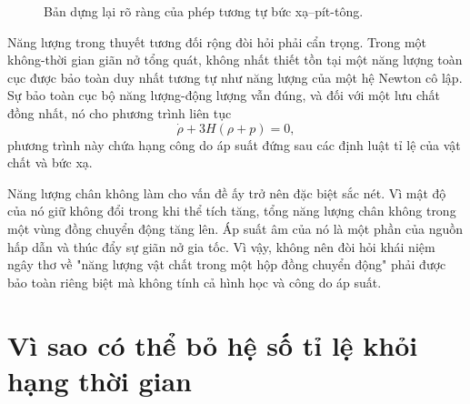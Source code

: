 \begin{figure}[H]
  \centering
  \caption{Bản dựng lại rõ ràng của phép tương tự bức xạ–pít-tông.}
  \label{fig:l09-piston-clean}
\end{figure}

Năng lượng trong thuyết tương đối rộng đòi hỏi phải cẩn trọng. Trong một không-thời gian giãn nở tổng quát, không nhất thiết tồn tại một năng lượng toàn cục được bảo toàn duy nhất tương tự như năng lượng của một hệ Newton cô lập. Sự bảo toàn cục bộ năng lượng-động lượng vẫn đúng, và đối với một lưu chất đồng nhất, nó cho phương trình liên tục
\begin{equation}
  \dot\rho+3H(\rho+p)=0,
  \label{eq:l09-continuity}
\end{equation}
phương trình này chứa hạng công do áp suất đứng sau các định luật tỉ lệ của vật chất và bức xạ.

Năng lượng chân không làm cho vấn đề ấy trở nên đặc biệt sắc nét. Vì mật độ của nó giữ không đổi trong khi thể tích tăng, tổng năng lượng chân không trong một vùng đồng chuyển động tăng lên. Áp suất âm của nó là một phần của nguồn hấp dẫn và thúc đẩy sự giãn nở gia tốc. Vì vậy, không nên đòi hỏi khái niệm ngây thơ về "năng lượng vật chất trong một hộp đồng chuyển động" phải được bảo toàn riêng biệt mà không tính cả hình học và công do áp suất.

\section{Vì sao có thể bỏ hệ số tỉ lệ khỏi hạng thời gian}

